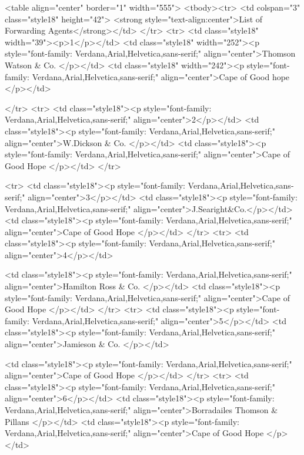  <table align="center" border="1" width="555">
              <tbody><tr>
<td colspan="3" class="style18" height="42">
<strong style="text-align:center">List of Forwarding Agents</strong></td>
              </tr>
              <tr>
<td class="style18" width="39"><p>1</p></td>
<td class="style18" width="252"><p style="font-family: Verdana,Arial,Helvetica,sans-serif;" align="center">Thomson Watson & Co. </p></td>
<td class="style18" width="242"><p style="font-family: Verdana,Arial,Helvetica,sans-serif;" align="center">Cape of Good hope </p></td>

    </tr>
              <tr>
                <td class="style18"><p style="font-family: Verdana,Arial,Helvetica,sans-serif;" align="center">2</p></td>
                <td class="style18"><p style="font-family: Verdana,Arial,Helvetica,sans-serif;" align="center">W.Dickson & Co. </p></td>
                <td class="style18"><p style="font-family: Verdana,Arial,Helvetica,sans-serif;" align="center">Cape of Good Hope </p></td>
              </tr>

              <tr>
                <td class="style18"><p style="font-family: Verdana,Arial,Helvetica,sans-serif;" align="center">3</p></td>
                <td class="style18"><p style="font-family: Verdana,Arial,Helvetica,sans-serif;" align="center">J.Searight&Co.</p></td>
                <td class="style18"><p style="font-family: Verdana,Arial,Helvetica,sans-serif;" align="center">Cape of Good Hope </p></td>
              </tr>
              <tr>
                <td class="style18"><p style="font-family: Verdana,Arial,Helvetica,sans-serif;" align="center">4</p></td>

                <td class="style18"><p style="font-family: Verdana,Arial,Helvetica,sans-serif;" align="center">Hamilton Ross & Co. </p></td>
                <td class="style18"><p style="font-family: Verdana,Arial,Helvetica,sans-serif;" align="center">Cape of Good Hope </p></td>
              </tr>
              <tr>
                <td class="style18"><p style="font-family: Verdana,Arial,Helvetica,sans-serif;" align="center">5</p></td>
                <td class="style18"><p style="font-family: Verdana,Arial,Helvetica,sans-serif;" align="center">Jamieson & Co. </p></td>

                <td class="style18"><p style="font-family: Verdana,Arial,Helvetica,sans-serif;" align="center">Cape of Good Hope </p></td>
              </tr>
              <tr>
                <td class="style18"><p style="font-family: Verdana,Arial,Helvetica,sans-serif;" align="center">6</p></td>
                <td class="style18"><p style="font-family: Verdana,Arial,Helvetica,sans-serif;" align="center">Borradailes Thomson & Pillans </p></td>
                <td class="style18"><p style="font-family: Verdana,Arial,Helvetica,sans-serif;" align="center">Cape of Good Hope </p></td>

